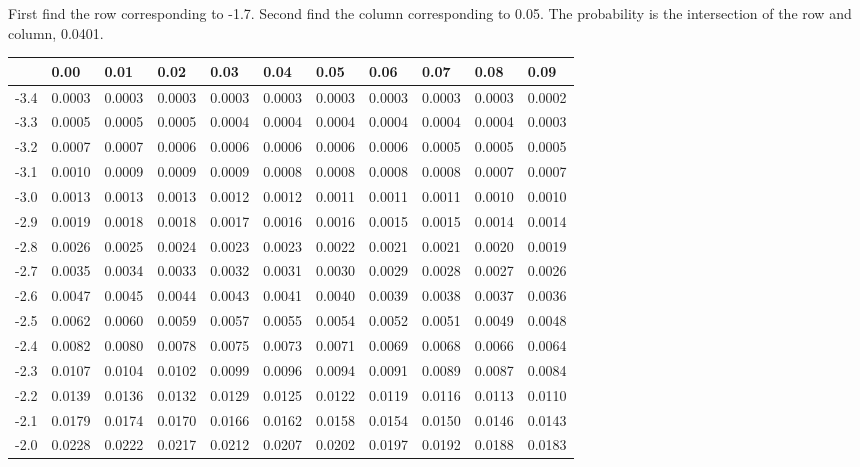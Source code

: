 \begin{frame} {\small First find the row corresponding to -1.7. Second
    find the column corresponding to 0.05. The probability is the
    intersection of the row and column, 0.0401.}

  {
\fontsize{5pt}{5pt}
\selectfont

\begin{tabular}{l|lllll>{\columncolor{blue}}lllll}
     & 0.00   & 0.01   & 0.02   & 0.03   &  0.04   & 0.05   & 0.06   & 0.07   & 0.08  & 0.09 \\ \hline
-3.4 & 0.0003 & 0.0003 & 0.0003 & 0.0003 & 0.0003 & 0.0003 & 0.0003 & 0.0003 & 0.0003 & 0.0002 \\ 
-3.3 & 0.0005 & 0.0005 & 0.0005 & 0.0004 & 0.0004 & 0.0004 & 0.0004 & 0.0004 & 0.0004 & 0.0003 \\ 
-3.2 & 0.0007 & 0.0007 & 0.0006 & 0.0006 & 0.0006 & 0.0006 & 0.0006 & 0.0005 & 0.0005 & 0.0005 \\ 
-3.1 & 0.0010 & 0.0009 & 0.0009 & 0.0009 & 0.0008 & 0.0008 & 0.0008 & 0.0008 & 0.0007 & 0.0007 \\ 
-3.0 & 0.0013 & 0.0013 & 0.0013 & 0.0012 & 0.0012 & 0.0011 & 0.0011 & 0.0011 & 0.0010 & 0.0010 \\ 
-2.9 & 0.0019 & 0.0018 & 0.0018 & 0.0017 & 0.0016 & 0.0016 & 0.0015 & 0.0015 & 0.0014 & 0.0014 \\ 
-2.8 & 0.0026 & 0.0025 & 0.0024 & 0.0023 & 0.0023 & 0.0022 & 0.0021 & 0.0021 & 0.0020 & 0.0019 \\ 
-2.7 & 0.0035 & 0.0034 & 0.0033 & 0.0032 & 0.0031 & 0.0030 & 0.0029 & 0.0028 & 0.0027 & 0.0026 \\ 
-2.6 & 0.0047 & 0.0045 & 0.0044 & 0.0043 & 0.0041 & 0.0040 & 0.0039 & 0.0038 & 0.0037 & 0.0036 \\ 
-2.5 & 0.0062 & 0.0060 & 0.0059 & 0.0057 & 0.0055 & 0.0054 & 0.0052 & 0.0051 & 0.0049 & 0.0048 \\ 
-2.4 & 0.0082 & 0.0080 & 0.0078 & 0.0075 & 0.0073 & 0.0071 & 0.0069 & 0.0068 & 0.0066 & 0.0064 \\ 
-2.3 & 0.0107 & 0.0104 & 0.0102 & 0.0099 & 0.0096 & 0.0094 & 0.0091 & 0.0089 & 0.0087 & 0.0084 \\ 
-2.2 & 0.0139 & 0.0136 & 0.0132 & 0.0129 & 0.0125 & 0.0122 & 0.0119 & 0.0116 & 0.0113 & 0.0110 \\ 
-2.1 & 0.0179 & 0.0174 & 0.0170 & 0.0166 & 0.0162 & 0.0158 & 0.0154 & 0.0150 & 0.0146 & 0.0143 \\ 
-2.0 & 0.0228 & 0.0222 & 0.0217 & 0.0212 & 0.0207 & 0.0202 & 0.0197 & 0.0192 & 0.0188 & 0.0183 \\ 

\end{tabular}}
\end{frame}
